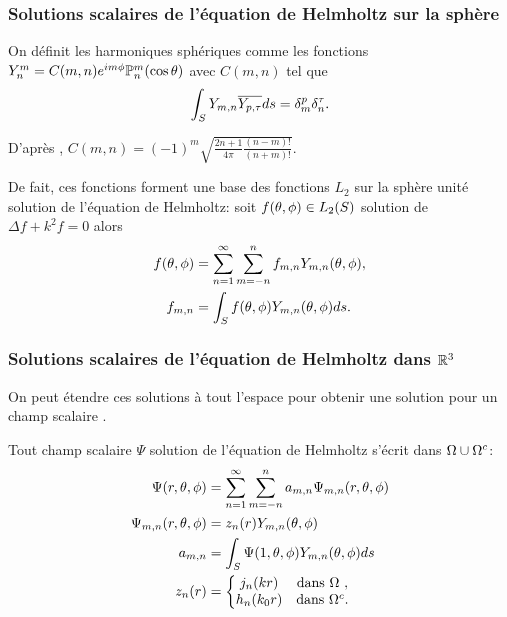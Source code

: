 \subsubsection{Solutions scalaires de l'équation de Helmholtz sur la sphère}

On définit les harmoniques sphériques comme les fonctions \(Y_n^m = C(m,n) e^{im\phi}\mathbb{P}^m_n(\cos \theta) \) avec \(C(m,n)\) tel que
\[
 \displaystyle\int_S Y_{m,n} {\overline{Y_{p,\tau}}} ds = \delta_m^p \delta_n^\tau.
\]

D’après \cite[p.~24]{nedelec_acoustic_2001}, \( C(m,n) = (-1)^m\sqrt{\frac{2n+1}{4\pi}\frac{(n-m)!}{(n+m)!}}\).

De fait, ces fonctions forment une base des fonctions \(L_2\) sur la sphère unité solution de l'équation de Helmholtz: soit \(f(\theta,\phi) \in L_2(S)\) solution de \( \Delta f + k^2 f = 0 \) alors
  \begin{align}
    f(\theta,\phi) &= \sum\limits_{n=1}^\infty\sum\limits_{m=-n}^n f_{m,n} Y_{m,n} (\theta,\phi),
    \\
    \notag f_{m,n} &= \int_S f(\theta,\phi) Y_{m,n}(\theta,\phi) ds.
  \end{align}


\subsubsection{Solutions scalaires de l'équation de Helmholtz dans \(\mathbb R^3\)}
On peut étendre ces solutions à tout l'espace pour obtenir une solution pour un champ scalaire .

Tout champ scalaire \(\Psi\) solution de l'équation de Helmholtz s'écrit dans \(\Omega\cup\Omega^c\):
\begin{align}
\label{eq:helm:sol_helmoltz_scal_somme}
\Psi(r,\theta,\phi) &= \sum\limits_{n=1}^\infty\sum\limits_{m=-n}^n a_{m,n} \Psi_{m,n}(r,\theta,\phi) \\
\Psi_{m,n}(r,\theta,\phi) &= z_n(r) Y_{m,n}(\theta,\phi) \\
\notag a_{m,n} &= \int_S \Psi(1,\theta,\phi) Y_{m,n}(\theta,\phi) ds \\
z_n(r) &= \left\lbrace
  \begin{matrix}
  j_n(kr) &   \text{dans \(\Omega~\)},
  \\
  h_n(k_0r) & \text{dans \(\Omega^c\)}.
  \end{matrix}\right.
\end{align}

